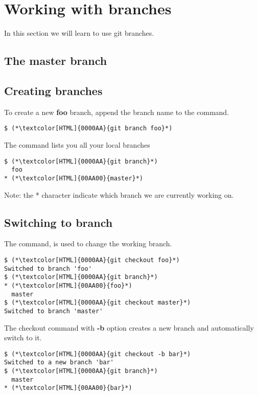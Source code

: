 \section{Working with branches}
\begin{frame}[fragile]
    \slidetitle
In this section we will learn to use git branches.
\end{frame}

\subsection{The master branch}
\begin{frame}[fragile]
    \subslidetitle
\end{frame}

\subsection{Creating branches}
\begin{frame}[fragile]
    \subslidetitle

To create a new \textbf{foo} branch, append the branch name to the  command.
\begin{lstlisting}
$ (*\textcolor[HTML]{0000AA}{git branch foo}*)
\end{lstlisting}

The  command lists you all your local branches
\begin{lstlisting}
$ (*\textcolor[HTML]{0000AA}{git branch}*)
  foo
* (*\textcolor[HTML]{00AA00}{master}*)
\end{lstlisting}

Note: the * character indicate which branch we are currently working on.
\end{frame}

\subsection{Switching to branch}
\begin{frame}[fragile]
    \subslidetitle
The  command, is used to change the working branch.
\begin{lstlisting}
$ (*\textcolor[HTML]{0000AA}{git checkout foo}*)
Switched to branch 'foo'
$ (*\textcolor[HTML]{0000AA}{git branch}*)
* (*\textcolor[HTML]{00AA00}{foo}*)
  master
$ (*\textcolor[HTML]{0000AA}{git checkout master}*)
Switched to branch 'master'
\end{lstlisting}

The checkout command with \textbf{-b} option creates a new branch and automatically switch to it.
\begin{lstlisting}
$ (*\textcolor[HTML]{0000AA}{git checkout -b bar}*)
Switched to a new branch 'bar'
$ (*\textcolor[HTML]{0000AA}{git branch}*)
  master
* (*\textcolor[HTML]{00AA00}{bar}*)
\end{lstlisting}
\end{frame}

